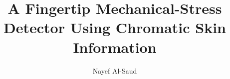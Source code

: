 \documentclass[a4paper,12pt,times,numbered,print,index,square, sort, numbers, authoryear]{Classes/PhDThesisPSnPDF}
\title{A Fingertip Mechanical-Stress Detector Using Chromatic Skin Information}
\author{Nayef Al-Saud}
\begin{document}
\frontmatter


\begin{titlepage}

\maketitle

\end{titlepage}








\tableofcontents

\listoffigures


\printnomencl

\mainmatter








\begin{appendices} %





%
%

\end{appendices}

\backmatter

\begin{spacing}{0.9}


%

\cleardoublepage


\end{spacing}

\printthesisindex %
\end{document}
